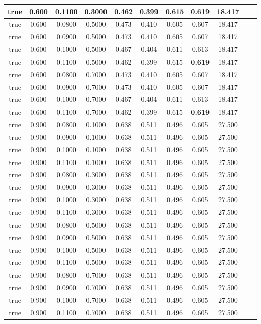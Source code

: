\documentclass{article}
\begin{document}
\begin{longtable}[c]{|c|c|c|c|c|c|c|c|c|c|c|}
 true & 0.600 & 0.1100 & 0.3000 & 0.462 & 0.399 & 0.615 & \cellcolor{gray!20} \textbf{0.619} & 18.417  \\ \hline 
 true & 0.600 & 0.0800 & 0.5000 & 0.473 & 0.410 & 0.605 & 0.607 & 18.417  \\ \hline 
 true & 0.600 & 0.0900 & 0.5000 & 0.473 & 0.410 & 0.605 & 0.607 & 18.417  \\ \hline 
 true & 0.600 & 0.1000 & 0.5000 & 0.467 & 0.404 & 0.611 & 0.613 & 18.417  \\ \hline 
 true & 0.600 & 0.1100 & 0.5000 & 0.462 & 0.399 & 0.615 & \cellcolor{gray!20} \textbf{0.619} & 18.417  \\ \hline 
 true & 0.600 & 0.0800 & 0.7000 & 0.473 & 0.410 & 0.605 & 0.607 & 18.417  \\ \hline 
 true & 0.600 & 0.0900 & 0.7000 & 0.473 & 0.410 & 0.605 & 0.607 & 18.417  \\ \hline 
 true & 0.600 & 0.1000 & 0.7000 & 0.467 & 0.404 & 0.611 & 0.613 & 18.417  \\ \hline 
 true & 0.600 & 0.1100 & 0.7000 & 0.462 & 0.399 & 0.615 & \cellcolor{gray!20} \textbf{0.619} & 18.417  \\ \hline 
 true & 0.900 & 0.0800 & 0.1000 & 0.638 & 0.511 & 0.496 & 0.605 & 27.500  \\ \hline 
 true & 0.900 & 0.0900 & 0.1000 & 0.638 & 0.511 & 0.496 & 0.605 & 27.500  \\ \hline 
 true & 0.900 & 0.1000 & 0.1000 & 0.638 & 0.511 & 0.496 & 0.605 & 27.500  \\ \hline 
 true & 0.900 & 0.1100 & 0.1000 & 0.638 & 0.511 & 0.496 & 0.605 & 27.500  \\ \hline 
 true & 0.900 & 0.0800 & 0.3000 & 0.638 & 0.511 & 0.496 & 0.605 & 27.500  \\ \hline 
 true & 0.900 & 0.0900 & 0.3000 & 0.638 & 0.511 & 0.496 & 0.605 & 27.500  \\ \hline 
 true & 0.900 & 0.1000 & 0.3000 & 0.638 & 0.511 & 0.496 & 0.605 & 27.500  \\ \hline 
 true & 0.900 & 0.1100 & 0.3000 & 0.638 & 0.511 & 0.496 & 0.605 & 27.500  \\ \hline 
 true & 0.900 & 0.0800 & 0.5000 & 0.638 & 0.511 & 0.496 & 0.605 & 27.500  \\ \hline 
 true & 0.900 & 0.0900 & 0.5000 & 0.638 & 0.511 & 0.496 & 0.605 & 27.500  \\ \hline 
 true & 0.900 & 0.1000 & 0.5000 & 0.638 & 0.511 & 0.496 & 0.605 & 27.500  \\ \hline 
 true & 0.900 & 0.1100 & 0.5000 & 0.638 & 0.511 & 0.496 & 0.605 & 27.500  \\ \hline 
 true & 0.900 & 0.0800 & 0.7000 & 0.638 & 0.511 & 0.496 & 0.605 & 27.500  \\ \hline 
 true & 0.900 & 0.0900 & 0.7000 & 0.638 & 0.511 & 0.496 & 0.605 & 27.500  \\ \hline 
 true & 0.900 & 0.1000 & 0.7000 & 0.638 & 0.511 & 0.496 & 0.605 & 27.500  \\ \hline 
 true & 0.900 & 0.1100 & 0.7000 & 0.638 & 0.511 & 0.496 & 0.605 & 27.500  \\ \hline 
 \end{longtable} 
\end{document}
